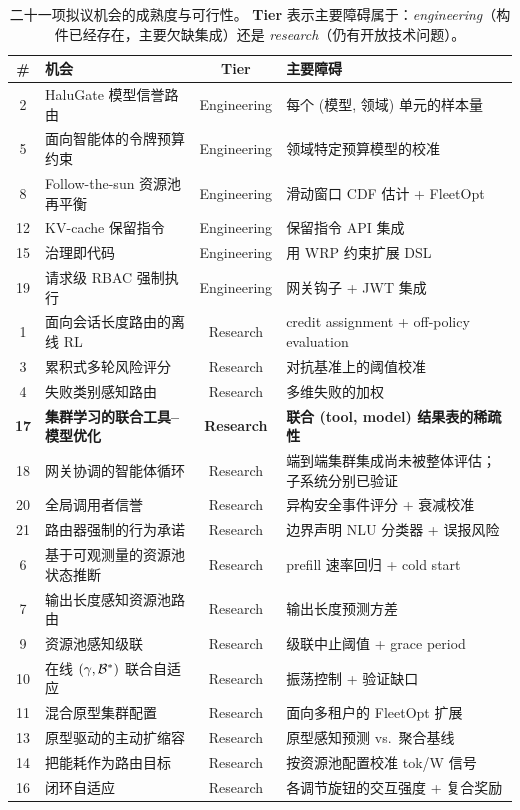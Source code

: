 \begin{table}[t]
\centering
\caption{二十一项拟议机会的成熟度与可行性。 \textbf{Tier} 表示主要障碍属于：\emph{engineering}（构件已经存在，主要欠缺集成）还是 \emph{research}（仍有开放技术问题）。}
\label{tab:maturity}
\small
\renewcommand{\arraystretch}{1.15}
\begin{tabularx}{\textwidth}{c l c X}
\toprule
\textbf{\#} & \textbf{机会} & \textbf{Tier} & \textbf{主要障碍} \\
\midrule
\rowcolor{routergreen!8}
2  & HaluGate 模型信誉路由 & Engineering & 每个 (模型, 领域) 单元的样本量 \\
5  & 面向智能体的令牌预算约束 & Engineering & 领域特定预算模型的校准 \\
\rowcolor{routergreen!8}
8  & Follow-the-sun 资源池再平衡 & Engineering & 滑动窗口 CDF 估计 + FleetOpt \\
12 & KV-cache 保留指令 & Engineering & 保留指令 API 集成 \\
\rowcolor{routergreen!8}
15 & 治理即代码 & Engineering & 用 WRP 约束扩展 DSL \\
19 & 请求级 RBAC 强制执行 & Engineering & 网关钩子 + JWT 集成 \\
\midrule
\rowcolor{poolorange!8}
1  & 面向会话长度路由的离线 RL & Research & credit assignment + off-policy evaluation \\
3  & 累积式多轮风险评分 & Research & 对抗基准上的阈值校准 \\
\rowcolor{poolorange!8}
4  & 失败类别感知路由 & Research & 多维失败的加权 \\
\textbf{17} & \textbf{集群学习的联合工具--模型优化} & \textbf{Research} & \textbf{联合 (tool, model) 结果表的稀疏性} \\
\rowcolor{poolorange!8}
18 & 网关协调的智能体循环 & Research & 端到端集群集成尚未被整体评估；子系统分别已验证 \\
\rowcolor{poolorange!8}
20 & 全局调用者信誉 & Research & 异构安全事件评分 + 衰减校准 \\
21 & 路由器强制的行为承诺 & Research & 边界声明 NLU 分类器 + 误报风险 \\
\rowcolor{poolorange!8}
6  & 基于可观测量的资源池状态推断 & Research & prefill 速率回归 + cold start \\
7  & 输出长度感知资源池路由 & Research & 输出长度预测方差 \\
\rowcolor{poolorange!8}
9  & 资源池感知级联 & Research & 级联中止阈值 + grace period \\
10 & 在线 $(\gamma, \mathcal{B}^*)$ 联合自适应 & Research & 振荡控制 + 验证缺口 \\
\rowcolor{poolorange!8}
11 & 混合原型集群配置 & Research & 面向多租户的 FleetOpt 扩展 \\
13 & 原型驱动的主动扩缩容 & Research & 原型感知预测 vs.\ 聚合基线 \\
\rowcolor{poolorange!8}
14 & 把能耗作为路由目标 & Research & 按资源池配置校准 tok/W 信号 \\
16 & 闭环自适应 & Research & 各调节旋钮的交互强度 + 复合奖励 \\
\bottomrule
\end{tabularx}
\end{table}

